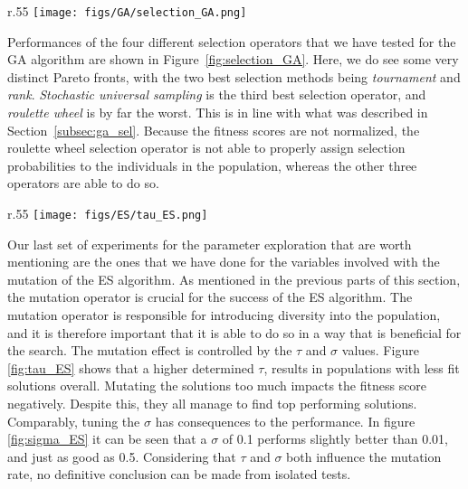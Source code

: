 \documentclass{article}
\begin{document}
\begin{wrapfigure}[12]{r}{.55\textwidth}
    \vspace{-2.5cm}
    \centering
    \texttt{[image: figs/GA/selection\_GA.png]}
    \captionsetup{width=.55\textwidth}
    \caption{
        Final function value comparison for all configurations with different selection operators for GA.
        }
        \label{fig:selection_GA}
\end{wrapfigure}

\vspace{2cm}
Performances of the four different selection operators that we have tested for the GA algorithm are shown in Figure~\ref{fig:selection_GA}.
Here, we do see some very distinct Pareto fronts, with the two best selection methods being \textit{tournament} and \textit{rank}.
\textit{Stochastic universal sampling} is the third best selection operator, and \textit{roulette wheel} is by far the worst.
This is in line with what was described in Section~\ref{subsec:ga_sel}.
Because the fitness scores are not normalized, the roulette wheel selection operator is not able to properly assign selection probabilities to the individuals in the population, whereas the other three operators are able to do so.

\newpage
    
\begin{wrapfigure}[21]{r}{.55\textwidth} 
    \vspace{-0.5cm}
    \centering
    \texttt{[image: figs/ES/tau\_ES.png]}
    \captionsetup{width=.55\textwidth}
    \caption{
        Final function value comparison for all configurations with different $\tau$ values for ES.
    }
    \label{fig:tau_ES}
\end{wrapfigure}

Our last set of experiments for the parameter exploration that are worth mentioning are the ones that we have done for the variables involved with the mutation of the ES algorithm.
As mentioned in the previous parts of this section, the mutation operator is crucial for the success of the ES algorithm.
The mutation operator is responsible for introducing diversity into the population, and it is therefore important that it is able to do so in a way that is beneficial for the search.
The mutation effect is controlled by the $\tau$ and $\sigma$ values. 
Figure \ref{fig:tau_ES} shows that a higher determined $\tau$, results in populations with less fit solutions overall. 
Mutating the solutions too much impacts the fitness score negatively.
Despite this, they all manage to find top performing solutions.
Comparably, tuning the $\sigma$ has consequences to the performance.
In figure \ref{fig:sigma_ES} it can be seen that a $\sigma$ of 0.1 performs slightly better than 0.01, and just as good as 0.5. 
Considering that $\tau$ and $\sigma$ both influence the mutation rate, no definitive conclusion can be made from isolated tests. 
\end{document}
